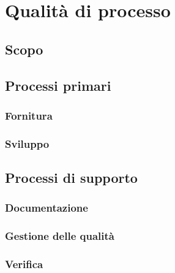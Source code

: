

\section{Qualità di processo}
\subsection{Scopo}
\subsection{Processi primari}
\subsubsection{Fornitura}
\subsubsection{Sviluppo}
\subsection{Processi di supporto}
\subsubsection{Documentazione}
\subsubsection{Gestione delle qualità}
\subsubsection{Verifica}
